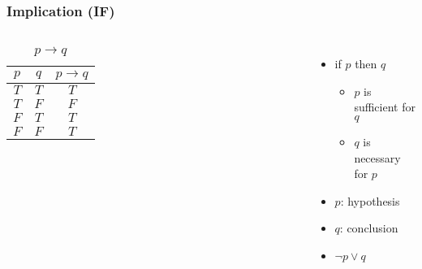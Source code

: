 \documentclass[dvipsnames]{beamer}
\begin{document}
\begin{frame}
  \frametitle{Implication (IF)}

  \begin{columns}
    \begin{table}
      \caption{$p \rightarrow q$}
      \begin{tabular}{|c|c||c|}\hline
        $p$ & $q$ & $p \rightarrow q$\\\hline\hline
        $T$ & $T$ & $T$\\\hline
        $T$ & $F$ & $F$\\\hline
        $F$ & $T$ & $T$\\\hline
        $F$ & $F$ & $T$\\\hline
      \end{tabular}
    \end{table}

    \begin{itemize}
      \item if $p$ then $q$
      \begin{itemize}
        \item $p$ is sufficient for $q$
        \item $q$ is necessary for $p$
      \end{itemize}

      \medskip
      \item $p$: \alert{hypothesis}
      \item $q$: \alert{conclusion}

      \pause
      \medskip
      \item $\neg p \vee q$
    \end{itemize}
  \end{columns}
\end{frame}
\end{document}
